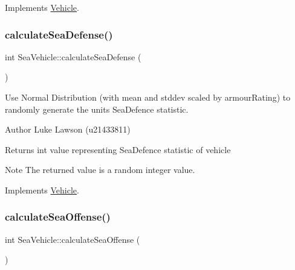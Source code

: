 Implements \mbox{\hyperlink{class_vehicle_a6b272c05209a8907ebe6229e66317f4a}{Vehicle}}.

\mbox{\label{class_sea_vehicle_aeca10ceffca2683364af15e67e666281}} 
\subsubsection{\texorpdfstring{calculateSeaDefense()}{calculateSeaDefense()}}
{\footnotesize\ttfamily int Sea\+Vehicle\+::calculate\+Sea\+Defense (\begin{DoxyParamCaption}{ }\end{DoxyParamCaption})\hspace{0.3cm}{\ttfamily [virtual]}}



Use Normal Distribution (with mean and stddev scaled by armour\+Rating) to randomly generate the unit\textquotesingle{}s Sea\+Defence statistic. 

\begin{DoxyAuthor}{Author}
Luke Lawson (u21433811) 
\end{DoxyAuthor}
\begin{DoxyReturn}{Returns}
int value representing Sea\+Defence statistic of vehicle 
\end{DoxyReturn}
\begin{DoxyNote}{Note}
The returned value is a random integer value. 
\end{DoxyNote}


Implements \mbox{\hyperlink{class_vehicle_a20e871b1ff13d47f4c875c987ed68add}{Vehicle}}.

\mbox{\label{class_sea_vehicle_a0b7105037f612389b5af8471801ecee0}} 
\subsubsection{\texorpdfstring{calculateSeaOffense()}{calculateSeaOffense()}}
{\footnotesize\ttfamily int Sea\+Vehicle\+::calculate\+Sea\+Offense (\begin{DoxyParamCaption}{ }\end{DoxyParamCaption})\hspace{0.3cm}{\ttfamily [virtual]}}



